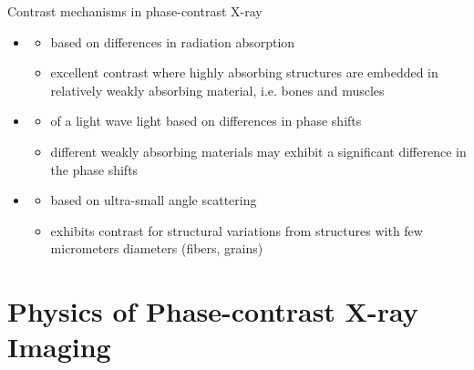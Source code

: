 \begin{frame}{Contrast mechanisms in phase-contrast X-ray}
    \begin{itemize}
        \item {}
              \begin{itemize}
                  \item based on differences in radiation absorption
                  \item excellent contrast where highly absorbing structures are embedded in relatively weakly absorbing material, i.e. bones and muscles\\[1cm]
              \end{itemize}
        \item {}
              \begin{itemize}
                  \item of a light wave light based on differences in phase shifts
                  \item different weakly absorbing materials may exhibit a significant difference in the phase shifts\\[1cm]
              \end{itemize}
        \item {}
              \begin{itemize}
                  \item based on ultra-small angle scattering
                  \item exhibits contrast for structural variations from structures with few micrometers diameters (fibers, grains)
              \end{itemize}
    \end{itemize}
\end{frame}

\section{Physics of Phase-contrast X-ray Imaging }%



